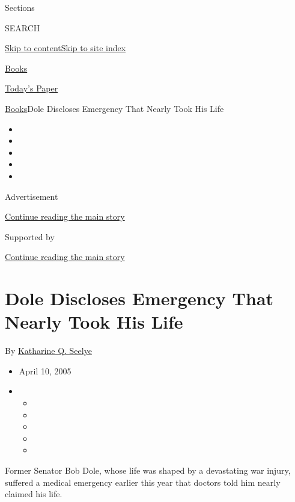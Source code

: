Sections

SEARCH

\protect\hyperlink{site-content}{Skip to
content}\protect\hyperlink{site-index}{Skip to site index}

\href{https://www.nytimes.com/section/books}{Books}

\href{https://myaccount.nytimes.com/auth/login?response_type=cookie\&client_id=vi}{}

\href{https://www.nytimes.com/section/todayspaper}{Today's Paper}

\href{/section/books}{Books}\textbar{}Dole Discloses Emergency That
Nearly Took His Life

\begin{itemize}
\item
\item
\item
\item
\item
\end{itemize}

Advertisement

\protect\hyperlink{after-top}{Continue reading the main story}

Supported by

\protect\hyperlink{after-sponsor}{Continue reading the main story}

\hypertarget{dole-discloses-emergency-that-nearly-took-his-life}{%
\section{Dole Discloses Emergency That Nearly Took His
Life}\label{dole-discloses-emergency-that-nearly-took-his-life}}

By \href{https://www.nytimes.com/by/katharine-q-seelye}{Katharine Q.
Seelye}

\begin{itemize}
\item
  April 10, 2005
\item
  \begin{itemize}
  \item
  \item
  \item
  \item
  \item
  \end{itemize}
\end{itemize}

Former Senator Bob Dole, whose life was shaped by a devastating war
injury, suffered a medical emergency earlier this year that doctors told
him nearly claimed his life.

